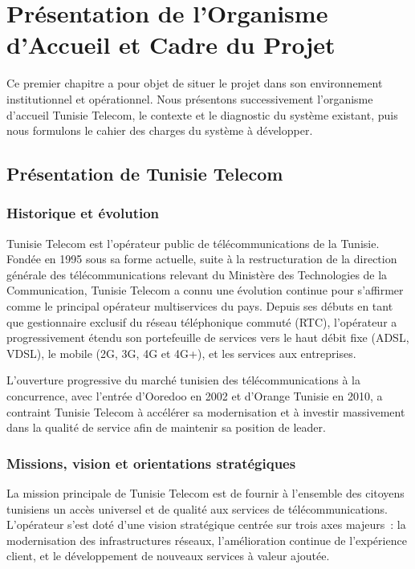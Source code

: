 \documentclass[11pt,a4paper]{report}
\begin{document}
\chapter{Présentation de l'Organisme d'Accueil et Cadre du Projet}

Ce premier chapitre a pour objet de situer le projet dans son environnement institutionnel et opérationnel. Nous présentons successivement l'organisme d'accueil Tunisie Telecom, le contexte et le diagnostic du système existant, puis nous formulons le cahier des charges du système à développer.

\section{Présentation de Tunisie Telecom}

\subsection{Historique et évolution}

Tunisie Telecom est l'opérateur public de télécommunications de la Tunisie. Fondée en 1995 sous sa forme actuelle, suite à la restructuration de la direction générale des télécommunications relevant du Ministère des Technologies de la Communication, Tunisie Telecom a connu une évolution continue pour s'affirmer comme le principal opérateur multiservices du pays. Depuis ses débuts en tant que gestionnaire exclusif du réseau téléphonique commuté (RTC), l'opérateur a progressivement étendu son portefeuille de services vers le haut débit fixe (ADSL, VDSL), le mobile (2G, 3G, 4G et 4G+), et les services aux entreprises.

L'ouverture progressive du marché tunisien des télécommunications à la concurrence, avec l'entrée d'Ooredoo en 2002 et d'Orange Tunisie en 2010, a contraint Tunisie Telecom à accélérer sa modernisation et à investir massivement dans la qualité de service afin de maintenir sa position de leader.

\subsection{Missions, vision et orientations stratégiques}

La mission principale de Tunisie Telecom est de fournir à l'ensemble des citoyens tunisiens un accès universel et de qualité aux services de télécommunications. L'opérateur s'est doté d'une vision stratégique centrée sur trois axes majeurs~: la modernisation des infrastructures réseaux, l'amélioration continue de l'expérience client, et le développement de nouveaux services à valeur ajoutée.
\end{document}
